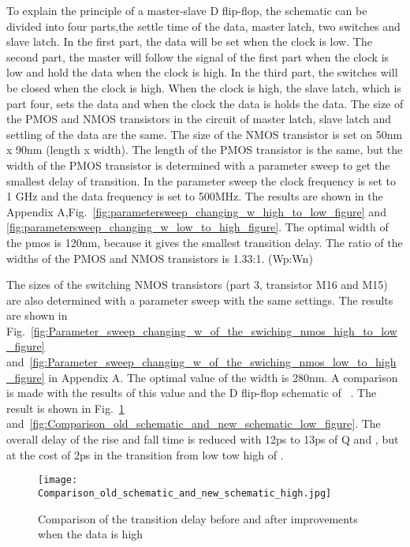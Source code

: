 To explain the principle of a master-slave D flip-flop, the schematic can be divided into four parts,the settle time of the data, master latch, two switches and slave latch. In the first part, the data will be set when the clock is low. The second part, the master will follow the signal of the first part when the clock is low and hold the data when the clock is high. In the third part, the switches will be closed when the clock is high. When the clock is high, the slave latch, which is part four, sets the data and when the clock the data is holds the data. 
The size of the PMOS and NMOS transistors in the circuit of master latch, slave latch and settling of the data are the same. The size of the NMOS transistor is set on 50nm x 90nm (length x width). The length of the PMOS transistor is the same, but the width of the PMOS transistor is determined with a parameter sweep to get the smallest delay of transition. In the parameter sweep the clock frequency is set to 1 GHz and the data frequency is set to 500MHz. The results are shown in the Appendix A,Fig.~\ref{fig:parametersweep_changing_w_high_to_low_figure} and \ref{fig:parametersweep_changing_w_low_to_high_figure}. The optimal width of the pmos is 120nm, because it gives the smallest transition delay. The ratio of the widths of the PMOS and NMOS transistors is 1.33:1. (Wp:Wn)

The sizes of the switching NMOS transistors (part 3, transistor M16 and M15) are also determined with a parameter sweep with the same settings. The results are shown in Fig.~\ref{fig:Parameter_sweep_changing_w_of_the_swiching_nmos_high_to_low_figure} and~\ref{fig:Parameter_sweep_changing_w_of_the_swiching_nmos_low_to_high_figure} in Appendix A. The optimal value of the width is 280nm. A comparison is made with the results of this value and the D flip-flop schematic of ~\cite{powerdac}. The result is shown in Fig.~\ref{fig:Comparison_old_schematic_and_new_schematic_high_figure} and~\ref{fig:Comparison_old_schematic_and_new_schematic_low_figure}. The overall delay of the rise and fall time is reduced with 12ps to 13ps of Q and , but at the cost of 2ps in the transition from low tow high of . 

\begin{figure}[h]
\texttt{[image: Comparison\_old\_schematic\_and\_new\_schematic\_high.jpg]}
\caption{Comparison of the transition delay before and after improvements when the data is high }
\label{fig:Comparison_old_schematic_and_new_schematic_high_figure}
\end{figure}

